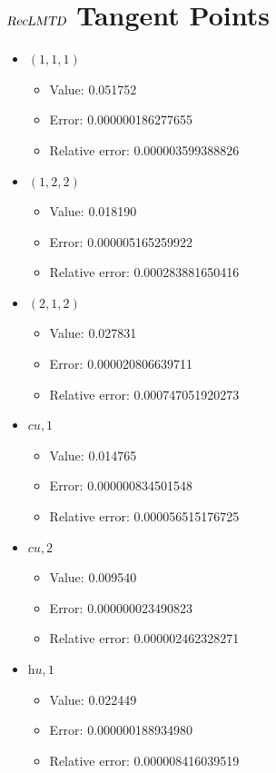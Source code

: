 \documentclass{article}%
\begin{document}
\section{$\textsl{RecLMTD}$ Tangent Points}%
\thispagestyle{plain}%
\begin{itemize}%
	\item $(1, 1, 1)$%
	\begin{itemize}%
		\item Value: 0.051752%
		\item Error: 0.000000186277655%
		\item Relative error: 0.000003599388826%
	\end{itemize}%
	\item $(1, 2, 2)$%
	\begin{itemize}%
		\item Value: 0.018190%
		\item Error: 0.000005165259922%
		\item Relative error: 0.000283881650416%
	\end{itemize}%
	\item $(2, 1, 2)$%
	\begin{itemize}%
		\item Value: 0.027831%
		\item Error: 0.000020806639711%
		\item Relative error: 0.000747051920273%
	\end{itemize}%
	\item $\textit{cu},1$%
	\begin{itemize}%
		\item Value: 0.014765%
		\item Error: 0.000000834501548%
		\item Relative error: 0.000056515176725%
	\end{itemize}%
	\item $\textit{cu},2$%
	\begin{itemize}%
		\item Value: 0.009540%
		\item Error: 0.000000023490823%
		\item Relative error: 0.000002462328271%
	\end{itemize}%
	\item $\textit{hu},1$%
	\begin{itemize}%
		\item Value: 0.022449%
		\item Error: 0.000000188934980%
		\item Relative error: 0.000008416039519%
	\end{itemize}%
\end{itemize}%
\end{document}

